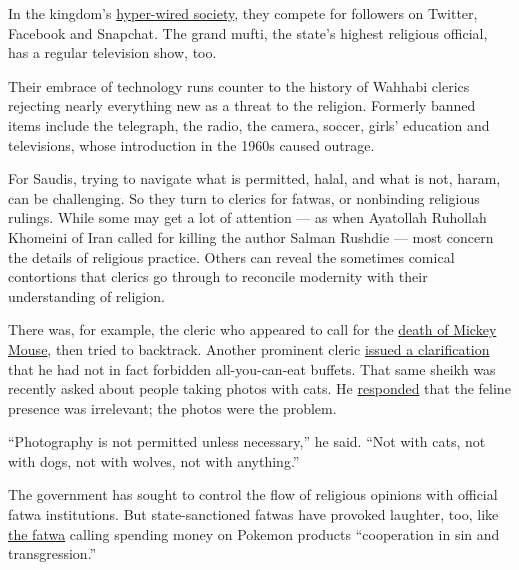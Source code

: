 In the kingdom's
\href{http://www.nytimes.com/2015/05/23/world/middleeast/saudi-arabia-youths-cellphone-apps-freedom.html?_r=0}{hyper-wired
society}, they compete for followers on Twitter, Facebook and Snapchat.
The grand mufti, the state's highest religious official, has a regular
television show, too.

Their embrace of technology runs counter to the history of Wahhabi
clerics rejecting nearly everything new as a threat to the religion.
Formerly banned items include the telegraph, the radio, the camera,
soccer, girls' education and televisions, whose introduction in the
1960s caused outrage.

For Saudis, trying to navigate what is permitted, halal, and what is
not, haram, can be challenging. So they turn to clerics for fatwas, or
nonbinding religious rulings. While some may get a lot of attention ---
as when Ayatollah Ruhollah Khomeini of Iran called for killing the
author Salman Rushdie --- most concern the details of religious
practice. Others can reveal the sometimes comical contortions that
clerics go through to reconcile modernity with their understanding of
religion.

There was, for example, the cleric who appeared to call for the
\href{https://www.youtube.com/watch?v=j7IpMIhR6Yg}{death of Mickey
Mouse}, then tried to backtrack. Another prominent cleric
\href{http://english.alarabiya.net/en/variety/2014/03/18/Saudi-cleric-claims-he-didn-t-issue-a-fatwa-against-all-you-can-eat-buffets.html}{issued
a clarification} that he had not in fact forbidden all-you-can-eat
buffets. That same sheikh was recently asked about people taking photos
with cats. He
\href{https://www.youtube.com/watch?v=aCMLdH1O6YU}{responded} that the
feline presence was irrelevant; the photos were the problem.

``Photography is not permitted unless necessary,'' he said. ``Not with
cats, not with dogs, not with wolves, not with anything.''

The government has sought to control the flow of religious opinions with
official fatwa institutions. But state-sanctioned fatwas have provoked
laughter, too, like
\href{http://alifta.com/Fatawa/fatawacoeval.aspx?languagename=en\&View=Page\&HajjEntryID=0\&HajjEntryName=\&RamadanEntryID=0\&RamadanEntryName=\&NodeID=4655\&PageID=14440\&SectionID=7\&SubjectPageTitlesID=15174\&MarkIndex=3\&0\#Intensiveintellectualinvasion}{the
fatwa} calling spending money on Pokemon products ``cooperation in sin
and transgression.''

